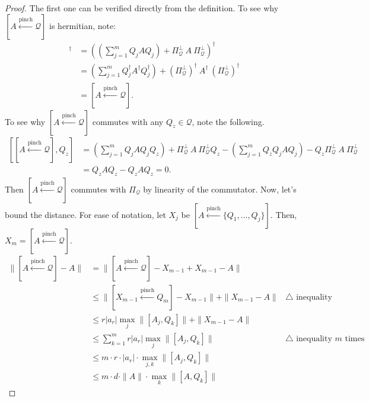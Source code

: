 \documentclass[12pt]{article}
\theoremstyle{plain}
\begin{document}
\begin{proof}
    The first one can be verified directly from the definition. To see why $[A \overset{\text{pinch}}{\gets} \mathcal{Q}]$ is hermitian, note:
    \begin{align*}
        [A \overset{\text{pinch}}{\gets} \mathcal{Q}]^\dagger &= \left(\left(\sum\limits_{j = 1}^m Q_j AQ_j\right) + \Pi_{\mathcal{Q}}^\bot \ A\ \Pi_{\mathcal{Q}}^\bot\right)^\dagger\\
        &= \left(\sum\limits_{j = 1}^m Q_j^\dagger A^\dagger Q_j^\dagger \right) + (\Pi_{\mathcal{Q}}^\bot)^\dagger \ A^\dagger\ (\Pi_{\mathcal{Q}}^\bot)^\dagger\\
        &= [A \overset{\text{pinch}}{\gets} \mathcal{Q}].
    \end{align*}
To see why $[A \overset{\text{pinch}}{\gets} \mathcal{Q}]$ commutes with any $Q_z \in \mathcal{Q}$, note the following.
\begin{align*}
    \left[[A \overset{\text{pinch}}{\gets} \mathcal{Q}], Q_z\right] &= \left(\sum\limits_{j = 1}^m Q_j AQ_j Q_z\right) + \Pi_{\mathcal{Q}}^\bot \ A\ \Pi_{\mathcal{Q}}^\bot Q_z - \left(\sum\limits_{j = 1}^m Q_z Q_j AQ_j\right) - Q_z\Pi_{\mathcal{Q}}^\bot \ A\ \Pi_{\mathcal{Q}}^\bot\\
    &= Q_z A Q_z - Q_z A Q_z = 0.
\end{align*}
Then $[A \overset{\text{pinch}}{\gets} \mathcal{Q}]$ commutes with $\Pi_{\mathcal{Q}}$ by linearity of the commutator.
Now, let's bound the distance. For ease of notation, let $X_{j}$ be $[A \overset{\text{pinch}}{\gets} \{Q_1, \dots, Q_j\}]$. Then, $X_m = [A \overset{\text{pinch}}{\gets} \mathcal{Q}]$.
\begin{align*}
    \|[A \overset{\text{pinch}}{\gets} \mathcal{Q}] - A\| &= \|[A \overset{\text{pinch}}{\gets} \mathcal{Q}] - X_{m-1} + X_{m-1} - A\|\\
    &\leq \|[X_{m-1} \overset{\text{pinch}}{\gets} Q_m] -X_{m-1}\| + \|X_{m-1} - A\| & \triangle  \text{ inequality}\\
    &\leq r |a_r| \max_{j}\| [A_j, Q_k]\| + \|X_{m-1} - A\|\\
    &\leq \sum\limits_{k = 1}^m r |a_r| \max_{j}\| [A_j, Q_k]\| & \triangle  \text{ inequality $m$ times}\\
    &\leq m \cdot r \cdot |a_r|\cdot \max_{j, k}\| [A_j, Q_k]\|\\
    &\leq m \cdot d \cdot \|A\|\cdot \max_{k}\| [A, Q_k]\|
\end{align*}
\end{proof}
\end{document}
